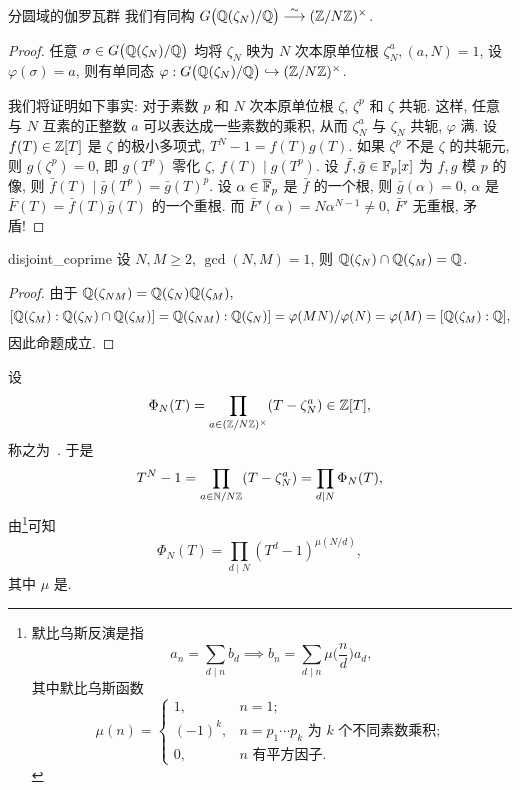 \begin{proposition}{分圆域的伽罗瓦群}{}
我们有同构 $G\bigl({\mathbb{Q}}(\zeta_N)/{\mathbb{Q}}\bigr)\stackrel{\sim}{\longrightarrow} ({\mathbb{Z}}/N{\mathbb{Z}})^\times$.
\end{proposition}
\begin{proof}
任意 $\sigma\in G\bigl({\mathbb{Q}}(\zeta_N)/{\mathbb{Q}}\bigr)$ 均将 $\zeta_N$ 映为 $N$ 次本原单位根 $\zeta_N^a,(a,N)=1$, 设 $\varphi(\sigma)=a$, 则有单同态 $\varphi: G\bigl({\mathbb{Q}}(\zeta_N)/{\mathbb{Q}}\bigr)\hookrightarrow ({\mathbb{Z}}/N{\mathbb{Z}})^\times$.

我们将证明如下事实: 对于素数 $p$ 和 $N$ 次本原单位根 $\zeta$, $\zeta^p$ 和 $\zeta$ 共轭. 这样, 任意与 $N$ 互素的正整数 $a$ 可以表达成一些素数的乘积, 从而 $\zeta_N^a$ 与 $\zeta_N$ 共轭, $\varphi$ 满. 设 $f(T)\in{\mathbb{Z}}[T]$ 是 $\zeta$ 的极小多项式, $T^N-1=f(T)g(T)$. 如果 $\zeta^p$ 不是 $\zeta$ 的共轭元, 则 $g(\zeta^p)=0$, 即 $g(T^p)$ 零化 $\zeta$, $f(T)\mid g(T^p)$. 设 $\bar f,\bar g\in{\mathbb{F}}_p[x]$ 为 $f,g$ 模 $p$ 的像, 则 $\bar f(T)\mid \bar g(T^p)=\bar g(T)^p$. 设 $\alpha\in\overline{{\mathbb{F}}}_p$ 是 $\bar f$ 的一个根, 则 $\bar g(\alpha)=0$, $\alpha$ 是 $\bar F(T)=\bar f(T)\bar g(T)$ 的一个重根. 而 $\bar F'(\alpha)=N\alpha^{N-1}\neq 0$, $\bar F'$ 无重根, 矛盾! 
\end{proof}

\begin{corollary}{}{disjoint_coprime}
设 $N,M\ge 2$, $\gcd(N,M)=1$, 则 ${\mathbb{Q}}(\zeta_N)\cap {\mathbb{Q}}(\zeta_M)={\mathbb{Q}}$.
\end{corollary}
\begin{proof}
由于 ${\mathbb{Q}}(\zeta_{NM})={\mathbb{Q}}(\zeta_N){\mathbb{Q}}(\zeta_M),$
  \[[{\mathbb{Q}}(\zeta_M):{\mathbb{Q}}(\zeta_N)\cap {\mathbb{Q}}(\zeta_M)]={\mathbb{Q}}(\zeta_{NM}):{\mathbb{Q}}(\zeta_N)]=\varphi(MN)/\varphi(N)=\varphi(M)=[{\mathbb{Q}}(\zeta_M):{\mathbb{Q}}],\]
因此命题成立.
\end{proof}

设 
  \[\Phi_N(T)=\prod_{a\in({\mathbb{Z}}/N{\mathbb{Z}})^\times} (T-\zeta_N^a)\in{\mathbb{Z}}[T],\]
称之为\ . 于是
	\[T^N-1=\prod_{a\in{\mathbb{N}}/N{\mathbb{Z}}}(T-\zeta_N^a)=\prod_{d\mid N}\Phi_N(T),\]
由\footnote{默比乌斯反演是指
\[a_n=\sum_{d\mid n}b_d\implies
b_n=\sum_{d\mid n}\mu\bigl(\frac nd\bigr)a_d,\]
其中默比乌斯函数
\[\mu(n)=\begin{cases}
  1,&n=1;\\
  (-1)^k,&n=p_1\cdots p_k\text{ 为 $k$ 个不同素数乘积};\\
  0,&n\text{ 有平方因子}.
\end{cases}\]
}可知
	\[\Phi_N(T)=\prod_{d\mid N}(T^d-1)^{\mu(N/d)},\]
其中 $\mu$ 是.

